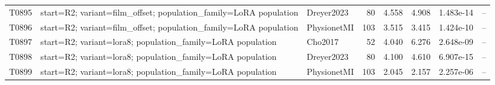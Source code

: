 \begin{longtable}{p{.45in}p{2.6in}p{.75in}rrrrr}
T0895 & start=R2; variant=film\_\allowbreak{}offset; population\_\allowbreak{}family=LoRA population & Dreyer2023 & 80 & 4.558 & 4.908 & 1.483e-14 & -- \\
T0896 & start=R2; variant=film\_\allowbreak{}offset; population\_\allowbreak{}family=LoRA population & PhysionetMI & 103 & 3.515 & 3.415 & 1.424e-10 & -- \\
T0897 & start=R2; variant=lora8; population\_\allowbreak{}family=LoRA population & Cho2017 & 52 & 4.040 & 6.276 & 2.648e-09 & -- \\
T0898 & start=R2; variant=lora8; population\_\allowbreak{}family=LoRA population & Dreyer2023 & 80 & 4.100 & 4.610 & 6.907e-15 & -- \\
T0899 & start=R2; variant=lora8; population\_\allowbreak{}family=LoRA population & PhysionetMI & 103 & 2.045 & 2.157 & 2.257e-06 & -- \\
\bottomrule
\end{longtable}
